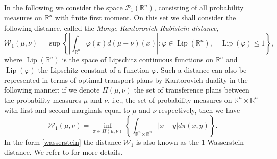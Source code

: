 \documentclass[11pt]{article}
\theoremstyle{plain}
\theoremstyle{definition}
\theoremstyle{remark}
\numberwithin{equation}{section}
\begin{document}
In the following we consider the space $\mathcal P_1(\mathbb R^n)$, consisting of all probability measures on $\mathbb R^n$ with finite
first moment. On this set we shall consider the following distance, called the {\it Monge-Kantorovich-Rubistein distance},
\begin{equation}\label{mkrdist}
\mathcal W_1(\mu,\nu)=\sup \left \{ \left | \int_{\mathbb R^n} \varphi(x) d (\mu-\nu)(x)  \right| : \varphi \in \operatorname{Lip}(\mathbb R^n), \quad \operatorname{Lip}(\varphi) \leq 1 \right \}, 
\end{equation}
where $\operatorname{Lip}(\mathbb R^n)$ is the space of Lipschitz continuous functions on $\mathbb R^n$ and $\operatorname{Lip}(\varphi)$ the Lipschitz constant of a function $\varphi$. 
Such a distance can also be represented in terms of optimal transport plans by Kantorovich duality in the following manner: if we denote $\Pi(\mu,\nu)$ the set of transference plans
between the probability measures $\mu$ and $\nu$, i.e., the set of probability measures on $\mathbb R^n \times \mathbb R^n$ with first and second marginals equal to $\mu$ and
$\nu$ respectively, then we have
\begin{equation}\label{wasserstein}
\mathcal W_1(\mu,\nu) =\inf_{\pi \in \Pi(\mu,\nu)} \left  \{ \int_{\mathbb  R^n \times \mathbb R^n} |x-y| d \pi(x,y) \right \}.
\end{equation}
In the form \eqref{wasserstein} the distance $\mathcal W_1$ is also known as the $1$-Wasserstein distance. 
We refer to \cite{AGS,vi09} for more details.
\end{document}
